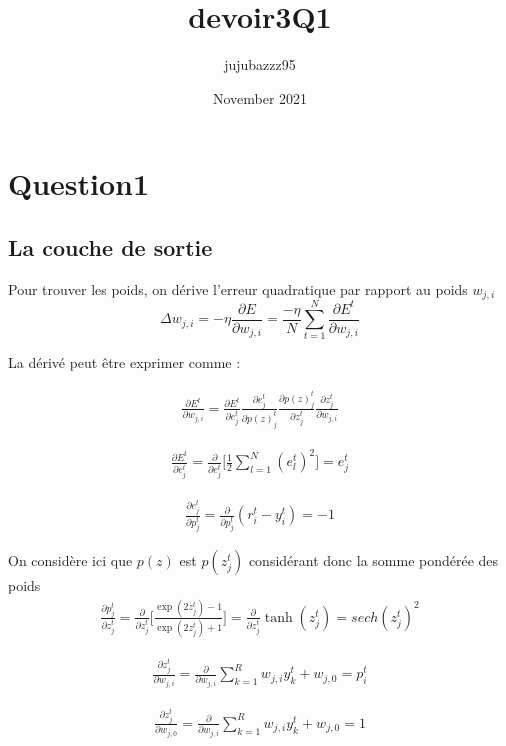 \documentclass{article}
\title{devoir3Q1}
\author{jujubazzz95 }
\date{November 2021}
\begin{document}
\maketitle

\section{Question1}

\subsection{La couche de sortie}

Pour trouver les poids, on dérive l'erreur quadratique par rapport au poids $ w_{j,i}$
$$
\Delta w_{j,i} = -\eta \frac{\partial E}{\partial w_{j,i}}= \frac{-\eta}{N} \sum_{t=1}^{N} \frac{\partial E^t}{\partial w_{j,i}}
$$

La dérivé peut être exprimer comme :

\begin{align}
    \frac{\partial E^t}{\partial w_{j,i}}=\frac{\partial E^t}{\partial e_{j}^t}\frac{\partial e_{j}^t}{\partial p(z)_{j}^t}\frac{\partial p(z)_{j}^t}{\partial z_{j}^t}\frac{\partial z_{j}^t}{\partial w_{j,i}}
\end{align}


\begin{align}
\frac{\partial E^t}{\partial e_{j}^t}=\frac{\partial}{\partial e_{j}^t}\Big[\frac{1}{2}\sum_{l=1}^N(e_l^t)^2\Big] = e_j^t
\end{align}

\begin{align}
\frac{\partial e_j^t}{\partial p_{j}^t}=\frac{\partial}{\partial p_j^t}(r_i^t-y_i^t)=-1
\end{align}

On considère ici que $p(z)$ est $p(z_j^t)$ considérant donc la somme pondérée des poids
\begin{align}
\frac{\partial p_j^t}{\partial z_{j}^t}=\frac{\partial}{\partial z_j^t}\Bigg[\frac{\exp{(2z_j^t)-1}}{\exp(2z_j^t)+1}\Bigg]=\frac{\partial}{\partial z_j^t} \tanh(z_{j}^t)=sech(z_{j}^t)^2
\end{align}

\begin{align}
\frac{\partial z_j^t}{\partial w_{j,i}}=\frac{\partial}{\partial w_{j,i}}\sum_{k=1}^R
 w_{j,i}y_k^t+w_{j,0}=p_i^t
\end{align}

\begin{align}
\frac{\partial z_j^t}{\partial w_{j,0}}=\frac{\partial}{\partial w_{j,i}}\sum_{k=1}^R
 w_{j,i}y_k^t+w_{j,0}=1
\end{align}
 
\end{document}
